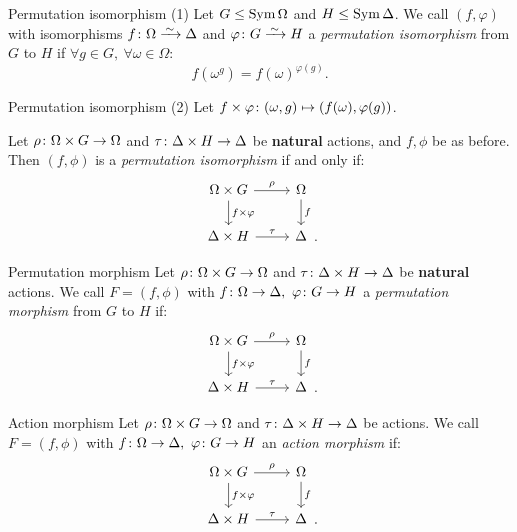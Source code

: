 \documentclass{beamer}
\theoremstyle{plain}
\theoremstyle{definition}
\begin{document}
\begin{frame}{Permutation isomorphism (1)}
Let $G \leq \operatorname{Sym} \Omega$ and $H \leq \operatorname{Sym} \Delta$.
We call $(f, \varphi)$ with
isomorphisms
$f \from \Omega \iso \Delta$
and
$\varphi \from G \iso H$
a \emph{permutation isomorphism}
from $G$ to $H$
if
$\forall g \in G, ~ \forall \omega \in \Omega :$
\[
    f(\omega ^ g) = f(\omega) ^ {\varphi(g)}.
\]
\end{frame}

\begin{frame}{Permutation isomorphism (2)}
Let
$f \times \varphi \colon (\omega, g) \mapsto (f(\omega), \varphi(g))$.

\pause
Let $\rho \colon \Omega \times G \rightarrow \Omega$ and
$\tau \colon \Delta \times H \rightarrow \Delta$ be \textbf{natural} actions,
and
$f, \phi$ be as before.
\pause
Then $(f, \phi)$ is a \emph{permutation isomorphism}
if and only if:
\vspace{1em}
\[
\begin{tikzcd}[ampersand replacement=\&]
    \Omega \times G
        \ar[r, "\rho"]
        \ar[d, "f \times \varphi"]
    \&
    \Omega
        \ar[d, "f"]
    \\
    \Delta \times H
        \ar[r, "\tau"]
    \&
    \Delta
\end{tikzcd}
\raisebox{-2em}{.}
\]
\end{frame}

\begin{frame}{Permutation morphism}
Let $\rho \colon \Omega \times G \rightarrow \Omega$ and
$\tau \colon \Delta \times H \rightarrow \Delta$ be \textbf{natural} actions.
We call $F = (f, \phi)$ with
$f \colon \Omega \rightarrow \Delta,~ \varphi \colon G \rightarrow H$
a \emph{permutation morphism} from $G$ to $H$
if:
\vspace{1em}
\[
\begin{tikzcd}[ampersand replacement=\&]
    \Omega \times G
        \ar[r, "\rho"]
        \ar[d, "f \times \varphi"]
    \&
    \Omega
        \ar[d, "f"]
    \\
    \Delta \times H
        \ar[r, "\tau"]
    \&
    \Delta
\end{tikzcd}
\raisebox{-2em}{.}
\]
\end{frame}

\begin{frame}{Action morphism}
Let $\rho \colon \Omega \times G \rightarrow \Omega$ and
$\tau \colon \Delta \times H \rightarrow \Delta$ be actions.
We call $F = (f, \phi)$ with
$f \colon \Omega \rightarrow \Delta,~ \varphi \colon G \rightarrow H$
an \emph{action morphism}
if:
\vspace{1em}
\[
\begin{tikzcd}[ampersand replacement=\&]
    \Omega \times G
        \ar[r, "\rho"]
        \ar[d, "f \times \varphi"]
    \&
    \Omega
        \ar[d, "f"]
    \\
    \Delta \times H
        \ar[r, "\tau"]
    \&
    \Delta
\end{tikzcd}
\raisebox{-2em}{.}
\]

\end{frame}
\end{document}
